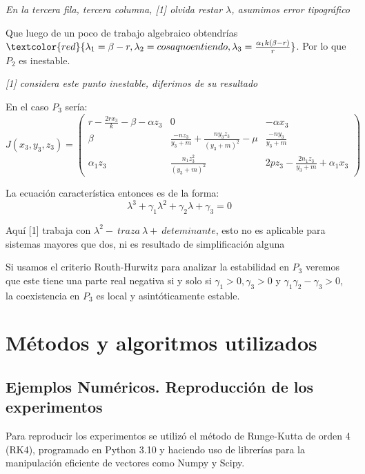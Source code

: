 \documentclass{wscpaperproc}
\theoremstyle{wsc}
\begin{document}
{\it En la tercera fila, tercera columna, [1] olvida restar $\lambda$, asumimos error tipográfico}

Que luego de un poco de trabajo algebraico obtendrías $\textcolor{red}{\lambda_1=\beta-r, \lambda_2=cosa q no entiendo, \lambda_3=\frac{\alpha_1 k(\beta-r)}{r}}$. Por lo que $P_2$ es inestable.

{\it [1] considera este punto inestable, diferimos de su resultado}


\vspace*{0.5cm}

En el caso $P_3$ sería:
$$ J(x_3, y_3, z_3) = \left(
	\begin{array}{ccc}
			r-\frac{2rx_3}{k}-\beta-\alpha z_3 & 0                                                 & -\alpha x_3                             \\
			\beta                              & \frac{-nz_3}{y_3+m}+\frac{ny_3z_3}{(y_3+m)^2}-\mu & \frac{-ny_3}{y_3+m}                     \\
			\alpha_1z_3                        & \frac{n_1z_3^2}{(y_3+m)^2}                        & 2pz_3-\frac{2n_1z_3}{y_3+m}+\alpha_1x_3
		\end{array}
	\right)$$

La ecuación característica entonces es de la forma:
$$\lambda^3+\gamma_1\lambda^2+\gamma_2\lambda+\gamma_3=0 $$

{Aquí [1] trabaja con $\lambda^2-\ traza\ \lambda+\ deteminante$, esto no es aplicable para sistemas mayores que dos, ni
es resultado de simplificación alguna}

Si usamos el criterio Routh-Hurwitz para analizar la estabilidad en $P_3$ veremos que este
tiene una parte real negativa si y solo si $\gamma_1>0, \gamma_3>0$ y $\gamma_1\gamma_2-\gamma_3>0$, la coexistencia en $P_3$ es local
y asintóticamente estable.

\vspace*{3cm}


\section*{Métodos y algoritmos utilizados}


\subsection*{Ejemplos Numéricos. Reproducción de los experimentos}

Para reproducir los experimentos se utilizó el método de Runge-Kutta de orden 4 (RK4), programado
en Python 3.10 y haciendo uso de librerías para la manipulación eficiente de vectores como Numpy y
Scipy.
\end{document}
